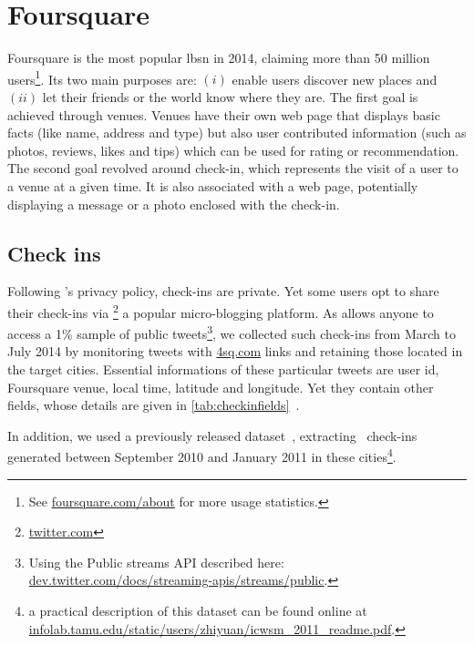 \section{Foursquare}
\label{sec:foursquare}

Foursquare is the most popular \gls{lbsn} in 2014, claiming more than 50
million users\footnote{See \href{https://foursquare.com/about/}%
{\url{foursquare.com/about}} for more usage statistics.}. Its two main purposes
are: $(i)$ enable users discover new places and $(ii)$ let their friends or the world know
where they are. The first goal is achieved through venues. Venues have their
own web page that displays basic facts (like name, address and type) but also
user contributed information (such as photos, reviews, likes and tips) which
can be used for rating or recommendation. The second goal revolved
around check-in, which represents the visit of a user to a venue at a given
time. It is also associated with a web page, potentially displaying a message
or a photo enclosed with the check-in.

\subsection{Check ins}

Following \fs's privacy policy, check-ins are private.  Yet some users opt to
share their check-ins via \tw\footnote{\href{https://twitter.com/}%
{\url{twitter.com}}} a popular micro-blogging platform. 
As \tw{} allows anyone to access a 1\% sample of public tweets\footnote{Using
the Public streams API described here:
\href{https://dev.twitter.com/docs/streaming-apis/streams/public}%
{\url{dev.twitter.com/docs/streaming-apis/streams/public}}.},
we collected such check-ins
from March to July 2014 by monitoring tweets with
\url{4sq.com} links and retaining those located in the target cities.
Essential informations of these  particular tweets are user id, Foursquare venue,
local time, latitude and longitude. Yet they contain other fields, whose
details are given in \autoref{tab:checkinfields}~\pageref{tab:checkinfields}.

In addition, we used a previously released dataset~\autocite{dataset11},
extracting  \fs\ check-ins generated between September 2010
and January 2011 in these cities\footnote{a practical description of this
	dataset can be found online at
	\href{http://infolab.tamu.edu/static/users/zhiyuan/icwsm\_2011\_readme.pdf}%
{\url{infolab.tamu.edu/static/users/zhiyuan/icwsm_2011_readme.pdf}}.}.

